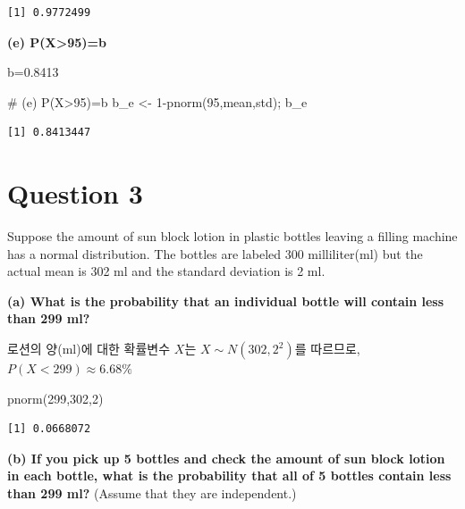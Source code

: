 \documentclass[
  letterpaper,
  DIV=11,
  numbers=noendperiod]{scrreprt}
\newenvironment{Shaded}{\begin{snugshade}}{\end{snugshade}}
\newcommand{\CommentTok}[1]{\textcolor[rgb]{0.37,0.37,0.37}{#1}}
\newcommand{\DecValTok}[1]{\textcolor[rgb]{0.68,0.00,0.00}{#1}}
\newcommand{\FunctionTok}[1]{\textcolor[rgb]{0.28,0.35,0.67}{#1}}
\newcommand{\NormalTok}[1]{\textcolor[rgb]{0.00,0.23,0.31}{#1}}
\newcommand{\OtherTok}[1]{\textcolor[rgb]{0.00,0.23,0.31}{#1}}
\newcommand{\SpecialCharTok}[1]{\textcolor[rgb]{0.37,0.37,0.37}{#1}}
\begin{document}
\begin{verbatim}
[1] 0.9772499
\end{verbatim}

\textbf{(e) P(X\textgreater95)=b}

b=0.8413

\begin{Shaded}
\begin{Highlighting}[]
\CommentTok{\# (e) P(X\textgreater{}95)=b}
\NormalTok{b\_e }\OtherTok{\textless{}{-}} \DecValTok{1}\SpecialCharTok{{-}}\FunctionTok{pnorm}\NormalTok{(}\DecValTok{95}\NormalTok{,mean,std); b\_e}
\end{Highlighting}
\end{Shaded}

\begin{verbatim}
[1] 0.8413447
\end{verbatim}

\section*{Question 3}\label{question-3-1}


Suppose the amount of sun block lotion in plastic bottles leaving a
filling machine has a normal distribution. The bottles are labeled 300
milliliter(ml) but the actual mean is 302 ml and the standard deviation
is 2 ml.

\textbf{(a) What is the probability that an individual bottle will
contain less than 299 ml?}

로션의 양(ml)에 대한 확률변수 \(X\)는 \(X\sim N(302,2^2)\)를 따르므로,
\(P(X<299)\approx 6.68\%\)

\begin{Shaded}
\begin{Highlighting}[]
\FunctionTok{pnorm}\NormalTok{(}\DecValTok{299}\NormalTok{,}\DecValTok{302}\NormalTok{,}\DecValTok{2}\NormalTok{)}
\end{Highlighting}
\end{Shaded}

\begin{verbatim}
[1] 0.0668072
\end{verbatim}

\textbf{(b) If you pick up 5 bottles and check the amount of sun block
lotion in each bottle, what is the probability that all of 5 bottles
contain less than 299 ml?} (Assume that they are independent.)
\end{document}
